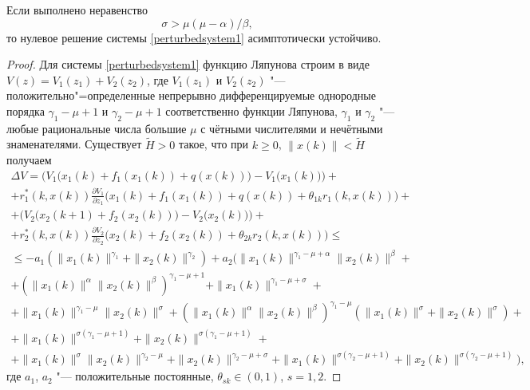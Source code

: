 \smallskip

\begin{theorem}[1]Если выполнено неравенство
\begin{equation}
\sigma>\mu(\mu-\alpha)/\beta, \label{theorem1}
\end{equation}
то нулевое решение системы \eqref{perturbedsystem1}
 асимптотически
устойчиво\rm.
\end{theorem}

\smallskip

\begin{proof} Для системы \eqref{perturbedsystem1} функцию
Ляпунова строим в виде $ V(z)=V_1(z_1)+V_2(z_2)$, где $V_1(z_1)$ и
$V_2(z_2)$ "--- положительно"=определенные непрерывно
дифференцируемые однородные порядка $\gamma_1-\mu+1$ и
${\gamma_2-\mu+1}$ соответственно функции Ляпунова, $\gamma_1$ и
$\gamma_2$ "--- любые рациональные числа большие $\mu$ с чётными
числителями и нечётными знаменателями. Существует $\tilde{H}>0$
такое, что при $k\geq 0$, $\|x(k)\|<\tilde{H}$ получаем
\begin{multline*}
\Delta
V=\Big(V_1\big(x_1(k)+f_1(x_1(k))+q(x(k))\big)-V_1\big(x_1(k)\big)\Big)+\\+
r_1^{*}(k,x(k))\frac{\partial V_1}{\partial
z_1}\big(x_1(k)+f_1(x_1(k))+q(x(k))+\theta_{1k}r_1(k,x(k))\big)+\\
+\Big(V_2\big(x_2(k+1)+f_2(x_2(k))\big)-V_2\big(x_2(k)\big)\Big)+\\
+r_2^{*}(k,x(k))\frac{\partial V_2}{\partial
z_2}\big(x_2(k)+f_2(x_2(k))+\theta_{2k}r_2(k,x(k))\big)\leq \\
\leq-a_1(\|x_1(k)\|^{\gamma_1}+\|x_2(k)\|^{\gamma_2})+
a_2\Big(\|x_1(k)\|^{\gamma_1-\mu+\alpha}\|x_2(k)\|^{\beta}+\\
+(\|x_1(k)\|^{\alpha}\|x_2(k)\|^{\beta})^{\gamma_1-\mu+1}+
\|x_1(k)\|^{\gamma_1-\mu+\sigma}+\\
+\|x_1(k)\|^{\gamma_1-\mu}\|x_2(k)\|^{\sigma}+(\|x_1(k)\|^{\alpha}\|x_2(k)\|^{\beta})^{\gamma_1-\mu}(\|x_1(k)\|^{\sigma}+\|x_2(k)\|^{\sigma})+\\
+
\|x_1(k)\|^{\sigma(\gamma_1-\mu+1)}+\|x_2(k)\|^{\sigma(\gamma_1-\mu+1)}+\\
+\|x_1(k)\|^{\sigma}\|x_2(k)\|^{\gamma_2-\mu}+\|x_2(k)\|^{\gamma_2-\mu+\sigma}+
\|x_1(k)\|^{\sigma(\gamma_2-\mu+1)}+\|x_2(k)\|^{\sigma(\gamma_2-\mu+1)}\Big),
\end{multline*}
где $a_1$, $a_2$ "---  положительные постоянные,
$\theta_{sk}\in(0, 1)$, $s=1, 2$.


\end{proof}
